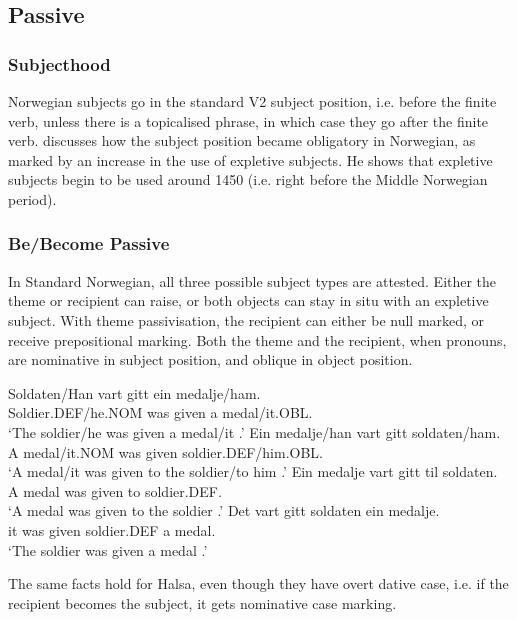 \subsection{Passive}
\subsubsection{Subjecthood}
Norwegian subjects go in the standard V2 subject position, i.e. before the finite verb, unless there is a topicalised phrase, in which case they go after the finite verb. \cite{Kinn.2010} discusses how the subject position became obligatory in Norwegian, as marked by an increase in the use of expletive subjects. He shows that expletive subjects begin to be used around 1450 (i.e. right before the Middle Norwegian period).
\subsubsection{Be/Become Passive}
In Standard Norwegian, all three possible subject types are attested. Either the theme or recipient can raise, or both objects can stay in situ with an expletive subject. With theme passivisation, the recipient can either be null marked, or receive prepositional marking. Both the theme and the recipient, when pronouns, are nominative in subject position, and oblique in object position.
\begin{exe}
\ex 
\begin{xlist}
\ex \gll Soldaten/Han vart gitt ein medalje/ham.\\
Soldier.DEF/he.NOM was given a medal/it.OBL.\\
\trans `The soldier/he was given a medal/it \citep{Afarli.1992,Holmberg.1995}.'
\ex \gll Ein medalje/han vart gitt soldaten/ham.\\
A medal/it.NOM was given soldier.DEF/him.OBL.\\
\trans `A medal/it was given to the soldier/to him \citep{Afarli.1992}.'
\ex \gll Ein medalje vart gitt til soldaten.\\
A medal was given to soldier.DEF.\\
\trans `A medal was given to the soldier \citep{Afarli.1992,Holmberg.1995}.'
\ex \gll Det vart gitt soldaten ein medalje.\\
it was given soldier.DEF a medal.\\
\trans `The soldier was given a medal \citep{Afarli.1992}.'
\end{xlist}
\end{exe}
The same facts hold for Halsa, even though they have overt dative case, i.e. if the recipient becomes the subject, it gets nominative case marking.
\begin{exe}
\ex
\begin{xlist}
\end{xlist}
\end{exe}
